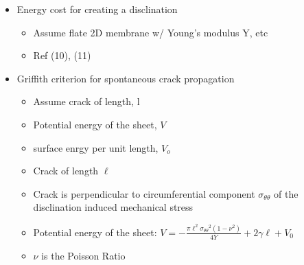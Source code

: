 \documentclass[11pt]{article}
\begin{document}
\begin{itemize}

\item Energy cost for creating a disclination\\
\label{sec-3.1.5.1}

\begin{itemize}

\item Assume flate 2D membrane w/ Young's modulus Y, etc\\
\label{sec-3.1.5.1.1}


\item Ref (10), (11)\\
\label{sec-3.1.5.1.2}

\end{itemize} %

\item Griffith criterion for spontaneous crack propagation\\
\label{sec-3.1.5.2}

\begin{itemize}

\item Assume crack of length, l\\
\label{sec-3.1.5.2.1}


\item Potential energy of the sheet, $V$\\
\label{sec-3.1.5.2.2}


\item surface enrgy per unit length, $V_o$\\
\label{sec-3.1.5.2.3}


\item Crack of length $\ell$\\
\label{sec-3.1.5.2.4}


\item Crack is perpendicular to circumferential component $\sigma_{\theta \theta}$ of the disclination induced mechanical stress\\
\label{sec-3.1.5.2.5}


\item Potential energy of the sheet: $V =-\frac{\pi \ell^2 {\sigma_{\theta \theta}}^2 (1-\nu^2)}{4 Y} + 2 \gamma \ell + V_0$\\
\label{sec-3.1.5.2.6}


\item $\nu$ is the Poisson Ratio\\
\label{sec-3.1.5.2.7}



\end{itemize}
\end{itemize}
\end{document}
